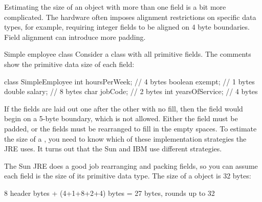 Estimating the size of an object with more than one field is a bit more complicated. The hardware often imposes alignment restrictions on specific data types, for example, requiring integer fields to be aligned on 4 byte boundaries. Field alignment can introduce more padding.
 
\begin{example}{Simple employee class}
Consider a  class with all primitive fields. The comments
show the primitive data size of each field:
\begin{verbatim2}
class SimpleEmployee {
    int hoursPerWeek;        // 4 bytes 
    boolean exempt;          // 1 bytes
    double salary;           // 8 bytes
    char jobCode;            // 2 bytes
    int yearsOfService;      // 4 bytes	
}
\end{verbatim2}
If the fields are laid out one after the other with no fill, then the
 field  would begin on a 5-byte boundary, which is
not allowed. Either the  field must be padded, or the fields must
be rearranged to fill in the empty spaces. To estimate the size of a
, you need to know which of these implementation
strategies the JRE uses. It turns out that the Sun and IBM use different strategies.
\end{example}
The Sun JRE does a good job rearranging and packing fields, so you can assume
each field is the size of its primitive data type. The size of a
 object is 32 bytes:
\begin{verbatim2}               
8 header bytes + (4+1+8+2+4) bytes = 27 bytes, rounds up to 32
\end{verbatim2} 

